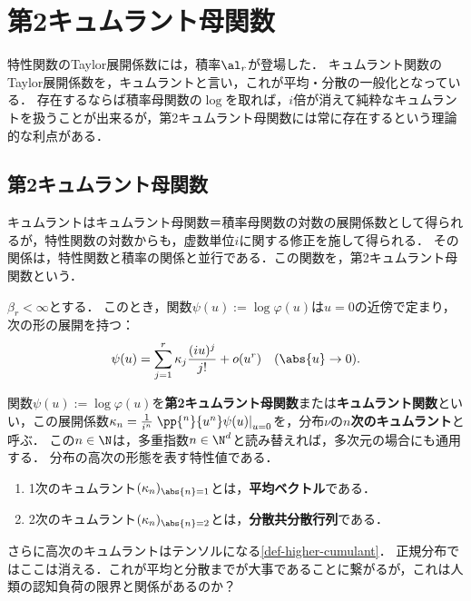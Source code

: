 \documentclass[uplatex,dvipdfmx]{jsreport}
\begin{document}
\section{第2キュムラント母関数}

\begin{tcolorbox}[colframe=ForestGreen, colback=ForestGreen!10!white,breakable,colbacktitle=ForestGreen!40!white,coltitle=black,fonttitle=\bfseries\sffamily,
title=]
    特性関数のTaylor展開係数には，積率$\al_r$が登場した．
    キュムラント関数のTaylor展開係数を，キュムラントと言い，これが平均・分散の一般化となっている．
    存在するならば積率母関数の$\log$を取れば，$i$倍が消えて純粋なキュムラントを扱うことが出来るが，第2キュムラント母関数には常に存在するという理論的な利点がある．
\end{tcolorbox}

\subsection{第2キュムラント母関数}

\begin{tcolorbox}[colframe=ForestGreen, colback=ForestGreen!10!white,breakable,colbacktitle=ForestGreen!40!white,coltitle=black,fonttitle=\bfseries\sffamily,
title=]
    キュムラントはキュムラント母関数＝積率母関数の対数の展開係数として得られるが，特性関数の対数からも，虚数単位$i$に関する修正を施して得られる．
    その関係は，特性関数と積率の関係と並行である．この関数を，第2キュムラント母関数という．
\end{tcolorbox}

\begin{proposition}[キュムラント関数のMaclaurin展開]
    $\beta_r<\infty$とする．
    このとき，関数$\psi(u):=\log\varphi(u)$は$u=0$の近傍で定まり，次の形の展開を持つ：
    \[\psi(u)=\sum^r_{j=1}\kappa_j\frac{(iu)^j}{j!}+o(u^r)\quad(\abs{u}\to0).\]
\end{proposition}

\begin{definition}[cuumulant]
    関数$\psi(u):=\log\varphi(u)$を\textbf{第2キュムラント母関数}または\textbf{キュムラント関数}といい，この展開係数$\kappa_n=\frac{1}{i^n}\left.\pp{^n}{u^n}\psi(u)\right|_{u=0}$を，分布$\nu$の\textbf{$n$次のキュムラント}と呼ぶ．
    この$n\in\N$は，多重指数$n\in\N^d$と読み替えれば，多次元の場合にも通用する．
    分布の高次の形態を表す特性値である．
\end{definition}

\begin{example}[キュムラントの例]\mbox{}
    \begin{enumerate}
        \item 1次のキュムラント$(\kappa_n)_{\abs{n}=1}$とは，\textbf{平均ベクトル}である．
        \item 2次のキュムラント$(\kappa_n)_{\abs{n}=2}$とは，\textbf{分散共分散行列}である．
    \end{enumerate}
    さらに高次のキュムラントはテンソルになる\ref{def-higher-cumulant}．
    正規分布ではここは消える．これが平均と分散までが大事であることに繋がるが，これは人類の認知負荷の限界と関係があるのか？
\end{example}
\end{document}
